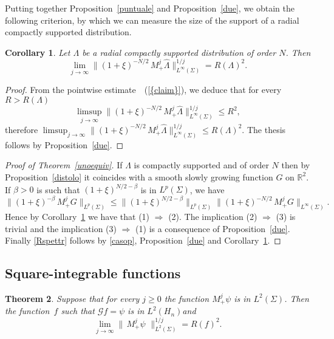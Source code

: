 \documentclass[12pt,a4paper]{amsart}
\theoremstyle{plain}
\newtheorem{theorem}{Theorem}[section]
\newtheorem{corollary}[theorem]{Corollary}
\theoremstyle{definition}
\numberwithin{equation}{section}
\begin{document}
 

Putting together Proposition~\ref{puntuale} and Proposition~\ref{due},
we obtain the following criterion, by which we can measure
the size of the support of a radial compactly supported distribution.

\begin{corollary}
\label{prop68}
Let $\Lambda$ be a radial compactly supported distribution of order $N$. Then 
$$
\lim_{j\to\infty} 
\|(1+\xi)^{-N/2}\, M_+^j\widehat\Lambda\|_{L^\infty({\Sigma})}^{1/j}= R(\Lambda)^2.
$$
\end{corollary}

\begin{proof}
From the pointwise estimate~{~(\ref{{claim}})}, we deduce that for every $R>R(\Lambda)$
$$
\limsup_{j\to\infty}
\|(1+\xi)^{-N/2}\, M_+^j\widehat\Lambda\|_{L^\infty({\Sigma})}^{1/j}\leq R^2,
$$
therefore $\displaystyle{\limsup_{j\to\infty}
\|(1+\xi)^{-N/2}\, M_+^j\widehat\Lambda\|_{L^\infty({\Sigma})}^{1/j}\leq R(\Lambda)^2}$.
The thesis follows by Proposition~\ref{due}.
\end{proof}

 
 \begin{proof}[Proof of Theorem~\ref{unoequiv}]
If $\Lambda$ is compactly supported  and 
of order $N$ then  by Proposition~\ref{distolo} it coincides with 
  a smooth slowly growing function $G$ on ${\mathbb R}^2$. If 
$\beta>0$ is such that
$(1+\xi)^{N/2-\beta}$ is in ${L^p({\Sigma})}$, we have
\begin{equation}
\label{casop}
\|(1+\xi)^{-\beta}\, M_+^jG\|_{L^p({\Sigma})} 
\leq 
\|(1+\xi)^{N/2-\beta} \|_{L^p({\Sigma})}
\|(1+\xi)^{-N/2}\, M_+^jG\|_{L^\infty ({\Sigma})}.
\end{equation}
Hence by  Corollary~\ref{prop68} we have that    (1) $\Rightarrow$ (2).
The implication (2) $\Rightarrow$ (3) is trivial and the implication   
   (3) $\Rightarrow$ (1) is a consequence of Proposition~\ref{due}. 
   Finally \eqref{Rspettr} follows by \eqref{casop},  Proposition~\ref{due} and Corollary~\ref{prop68}.
 \end{proof}

   \subsection{Square-integrable functions}

\begin{theorem}\label{teoL2}\label{tre}
Suppose that for every $j\geq 0$ the function
$M_+^j\psi$ is in $L^2({\Sigma})$. Then the function~$f$ such that ${\mathcal G} f=\psi$
is in $L^2({{H_{n}}})$and
$$
\lim_{j\to\infty} \|\,M_+^j\psi\,\,\|_{L^{2}({\Sigma})}^{1/j}= R(f)^2.
$$ 
\end{theorem}
\end{document}
